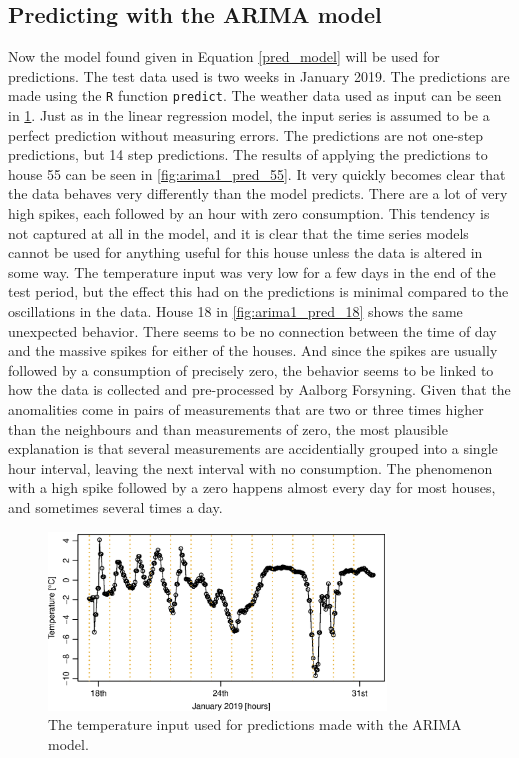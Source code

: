 \subsection{Predicting with the ARIMA model}
Now the model found given in Equation \ref{pred_model} will be used for predictions. The test data used is two weeks in January 2019. The predictions are made using the \texttt{R} function \texttt{predict}. The  weather data used as input can be seen in \cref{fig:weather_pred_hour}. Just as in the linear regression model, the input series is assumed to be a perfect prediction without measuring errors. The predictions are not one-step predictions, but 14 step predictions. The results of applying the predictions to house 55 can be seen in \cref{fig:arima1_pred_55}. It very quickly becomes clear that the data behaves very differently than the model predicts. There are a lot of very high spikes, each followed by an hour with zero consumption. This tendency is not captured at all in the model, and it is clear that the time series models cannot be used for anything useful for this house unless the data is altered in some way. The temperature input was very low for a few days in the end of the test period, but the effect this had on the predictions is minimal compared to the oscillations in the data. House 18 in \cref{fig:arima1_pred_18} shows the same unexpected behavior. There seems to be no connection between the time of day and the massive spikes for either of the houses. And since the spikes are usually followed by a consumption of precisely zero, the behavior seems to be linked to how the data is collected and pre-processed by Aalborg Forsyning. Given that the anomalities come in pairs of measurements that are two or three times higher than the neighbours and than measurements of zero, the most plausible explanation is that several measurements are accidentially grouped into a single hour interval, leaving the next interval with no consumption. The phenomenon with a high spike followed by a zero happens almost every day for most houses, and sometimes several times a day.

\begin{figure}
    \centering
    \includegraphics[width=0.8\textwidth]{../../../figures/TestWeatherHour.eps}
    \caption{The temperature input used for predictions made with the ARIMA model.}
    \label{fig:weather_pred_hour}
\end{figure}


